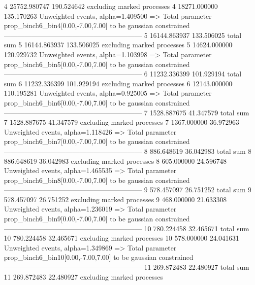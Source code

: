 4          25752.980747    190.524642      excluding marked processes    
4          18271.000000    135.170263      Unweighted events, alpha=1.409500
  => Total parameter prop_binch6_bin4[0.00,-7.00,7.00] to be gaussian constrained
------------------------------------------------------------
5          16144.863937    133.506025      total sum                     
5          16144.863937    133.506025      excluding marked processes    
5          14624.000000    120.929732      Unweighted events, alpha=1.103998
  => Total parameter prop_binch6_bin5[0.00,-7.00,7.00] to be gaussian constrained
------------------------------------------------------------
6          11232.336399    101.929194      total sum                     
6          11232.336399    101.929194      excluding marked processes    
6          12143.000000    110.195281      Unweighted events, alpha=0.925005
  => Total parameter prop_binch6_bin6[0.00,-7.00,7.00] to be gaussian constrained
------------------------------------------------------------
7          1528.887675     41.347579       total sum                     
7          1528.887675     41.347579       excluding marked processes    
7          1367.000000     36.972963       Unweighted events, alpha=1.118426
  => Total parameter prop_binch6_bin7[0.00,-7.00,7.00] to be gaussian constrained
------------------------------------------------------------
8          886.648619      36.042983       total sum                     
8          886.648619      36.042983       excluding marked processes    
8          605.000000      24.596748       Unweighted events, alpha=1.465535
  => Total parameter prop_binch6_bin8[0.00,-7.00,7.00] to be gaussian constrained
------------------------------------------------------------
9          578.457097      26.751252       total sum                     
9          578.457097      26.751252       excluding marked processes    
9          468.000000      21.633308       Unweighted events, alpha=1.236019
  => Total parameter prop_binch6_bin9[0.00,-7.00,7.00] to be gaussian constrained
------------------------------------------------------------
10         780.224458      32.465671       total sum                     
10         780.224458      32.465671       excluding marked processes    
10         578.000000      24.041631       Unweighted events, alpha=1.349869
  => Total parameter prop_binch6_bin10[0.00,-7.00,7.00] to be gaussian constrained
------------------------------------------------------------
11         269.872483      22.480927       total sum                     
11         269.872483      22.480927       excluding marked processes    
